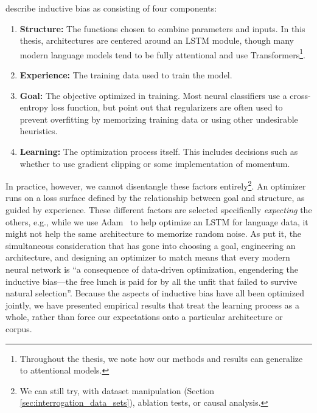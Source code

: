 
\citet{geirhos_shortcut_2020} describe inductive bias as consisting of four components:

\begin{enumerate}
    \item \textbf{Structure:} The functions chosen to combine parameters and inputs. In this thesis, architectures are centered around an LSTM module, though many modern language models tend to be fully attentional and use Transformers\footnote{Throughout the thesis, we note how our methods and results can generalize to attentional models.}. 
    \item \textbf{Experience:} The training data used to train the model.
    \item \textbf{Goal:} The objective optimized in training. Most neural classifiers use a cross-entropy loss function, but \citet{geirhos_shortcut_2020} point out that regularizers are often used to prevent overfitting by memorizing training data or using other undesirable heuristics.
    \item \textbf{Learning:} The optimization process itself. This includes decisions such as whether to use gradient clipping or some implementation of momentum.
\end{enumerate}

In practice, however, we cannot disentangle these factors entirely\footnote{We can still try, with dataset manipulation (Section \ref{sec:interrogation_data_sets}), ablation tests, or causal analysis.}. An optimizer runs on a loss surface defined by the relationship between goal and structure, as guided by experience. These different factors are selected specifically \textit{expecting} the others, e.g., while we use Adam~\citep{Kingma2015AdamAM} to help optimize an LSTM for language data, it might not help the same architecture to memorize random noise. As \citet{wang_curious_2020} put it, the simultaneous consideration that has gone into choosing a goal, engineering an architecture, and designing an optimizer to match means that every modern neural network is ``a consequence of data-driven optimization, engendering the inductive bias---the free lunch is paid for by all the unfit that failed to survive natural selection''. Because the aspects of inductive bias have all been optimized jointly, we have presented empirical results that treat the learning process as a whole, rather than force our expectations onto a particular architecture or corpus.

